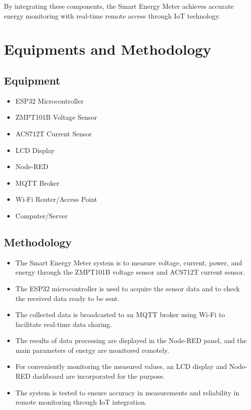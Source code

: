 \documentclass[a4paper,12pt]{report}
\begin{document}
By integrating these components, the Smart Energy Meter achieves accurate energy monitoring with real-time remote access through IoT technology.  


\section{Equipments and Methodology}\label{ch:intro}
\subsection{Equipment}
\begin{itemize}
    \item ESP32 Microcontroller
    \item ZMPT101B Voltage Sensor
    \item ACS712T Current Sensor
    \item LCD Display
    \item Node-RED
    \item MQTT Broker
    \item Wi-Fi Router/Access Point
    \item Computer/Server
\end{itemize}

\subsection{Methodology}
\begin{itemize}
    \item The Smart Energy Meter system is to measure voltage, current, power, and energy through the ZMPT101B voltage sensor and ACS712T current sensor.
    \item The ESP32 microcontroller is used to acquire the sensor data and to check the received data ready to be sent.
    \item The collected data is broadcasted to an MQTT broker using Wi-Fi to facilitate real-time data sharing.
    \item The results of data processing are displayed in the Node-RED panel, and the main parameters of energy are monitored remotely.
    \item For conveniently monitoring the measured values, an LCD display and Node-RED dashboard are incorporated for the purpose.
    \item The system is tested to ensure accuracy in measurements and reliability in remote monitoring through IoT integration.
\end{itemize}
\end{document}
